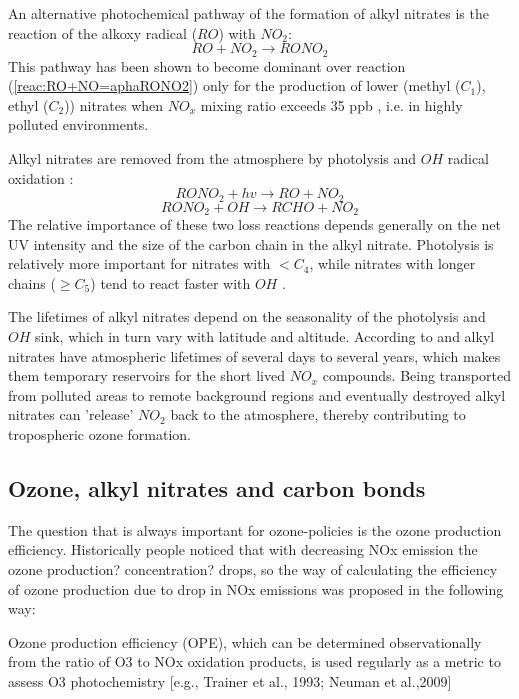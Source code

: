\documentclass[11pt,a4paper]{article}
\begin{document}
An alternative photochemical pathway of the formation of alkyl nitrates is the reaction of the alkoxy radical ($RO$) with $NO_2$:
\begin{equation}\label{reac:RO+NO2=RONO2}
RO + NO_2 \rightarrow RONO_2
\end{equation}
This pathway has been shown to become dominant over reaction (\ref{reac:RO+NO=aphaRONO2}) only for the production of lower (methyl ($C_1$), ethyl ($C_2$)) nitrates when $NO_x$ mixing ratio exceeds 35 ppb \citep{Archibald2007}, i.e. in highly polluted environments.

Alkyl nitrates are removed from the atmosphere by photolysis \citep{Turberg1990} and $OH$ radical oxidation \citep{Talukdar1997}:
\begin{equation} \label{reac:RONO2+hv=RO+NO2}
RONO_2 + hv \rightarrow RO + NO_2
\end{equation}
\begin{equation} \label{reac:RONO2+OH=RCHO+NO2}
RONO_2 + OH \rightarrow RCHO + NO_2
\end{equation}
The relative importance of these two loss reactions depends generally on the net UV intensity and the size of the carbon chain in the alkyl nitrate. Photolysis is relatively more important for nitrates with $< C_4$, while nitrates with longer chains ($\geq C_5$) tend to react faster with $OH$ \citep{Worton2010}.

The lifetimes of alkyl nitrates depend on the seasonality of the photolysis and $OH$ sink, which in turn vary with latitude and altitude. According to \citep{Clemitshaw1997} and \citep{Turberg1990} alkyl nitrates have atmospheric lifetimes of several days to several years, which makes them temporary reservoirs for the short lived $NO_x$ compounds. Being transported from polluted areas to remote background regions and eventually destroyed alkyl nitrates can 'release' $NO_2$ back to the atmosphere, thereby contributing to tropospheric ozone formation.
\subsection{Ozone, alkyl nitrates and carbon bonds}
The question that is always important for ozone-policies is the ozone production efficiency. Historically people noticed that with decreasing NOx emission the ozone production? concentration? drops, so the way of calculating the efficiency of ozone production due to drop in NOx emissions was proposed in the following way:

\citep{Neuman2012}
Ozone production efficiency (OPE), which can be determined observationally from the ratio of O3 to NOx oxidation products, is used regularly as a metric to assess O3 photochemistry [e.g., Trainer et al., 1993; Neuman et al.,2009]
\end{document}
